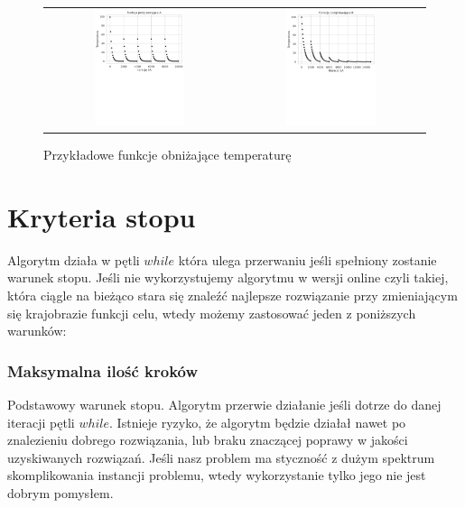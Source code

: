 \begin{figure}[!h]
\begin{tabular}{ c c }
	\includegraphics[width=0.5\textwidth]{gfx/temp_heater_a.pdf} & \includegraphics[width=0.5\textwidth]{gfx/temp_heater_b.pdf}
\end{tabular}
	\caption{Przykładowe funkcje obniżające temperaturę}
	\label{example-cooling-functions}
\end{figure}
\newpage
\section{Kryteria stopu}
\label{sec:stop-criteria}
Algorytm działa w pętli $while$ która ulega przerwaniu jeśli spełniony zostanie
warunek stopu. Jeśli nie wykorzystujemy algorytmu w wersji online czyli takiej,
która ciągle na bieżąco stara się znaleźć najlepsze rozwiązanie przy
zmieniającym się krajobrazie funkcji celu, wtedy możemy zastosować jeden z
poniższych warunków:

\subsubsection{Maksymalna ilość kroków} 
Podstawowy warunek stopu. Algorytm przerwie działanie jeśli dotrze do danej
iteracji pętli $while$. Istnieje ryzyko, że algorytm będzie działał nawet po
znalezieniu dobrego rozwiązania, lub braku znaczącej poprawy w jakości
uzyskiwanych rozwiązań. Jeśli nasz problem ma styczność z dużym spektrum
skomplikowania instancji problemu, wtedy wykorzystanie tylko jego nie jest
dobrym pomysłem.

